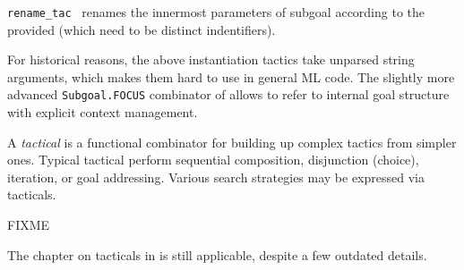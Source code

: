 \begin{isabellebody}
\begin{isamarkuptext}
\begin{description}
  \item \verb|rename_tac|~ renames the innermost
  parameters of subgoal  according to the provided  (which need to be distinct indentifiers).

  \end{description}

  For historical reasons, the above instantiation tactics take
  unparsed string arguments, which makes them hard to use in general
  ML code.  The slightly more advanced \verb|Subgoal.FOCUS| combinator
  of  allows to refer to internal goal
  structure with explicit context management.%
\end{isamarkuptext}%
\isamarkuptrue%
%
\endisatagmlref
{\isafoldmlref}%
%
\isadelimmlref
%
\endisadelimmlref
%
\isamarkuptrue%
%
\begin{isamarkuptext}%
A \emph{tactical} is a functional combinator for building up complex
  tactics from simpler ones.  Typical tactical perform sequential
  composition, disjunction (choice), iteration, or goal addressing.
  Various search strategies may be expressed via tacticals.

  \medskip FIXME

  \medskip The chapter on tacticals in \cite{isabelle-ref} is still
  applicable, despite a few outdated details.%
\end{isamarkuptext}%
\isamarkuptrue%
%
\isadelimtheory
%
\endisadelimtheory
%
\isatagtheory
{}\isamarkupfalse%
%
\endisatagtheory
{\isafoldtheory}%
%
\isadelimtheory
%
\endisadelimtheory
\isanewline
\end{isabellebody}%
